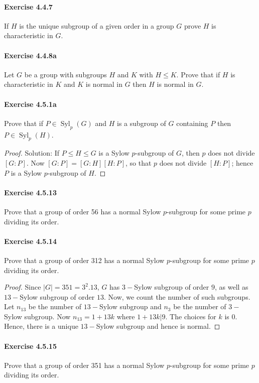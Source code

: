 \documentclass{article}
\theoremstyle{definition}
\begin{document}
\paragraph{Exercise 4.4.7} If $H$ is the unique subgroup of a given order in a group $G$ prove $H$ is characteristic in $G$.

\paragraph{Exercise 4.4.8a} Let $G$ be a group with subgroups $H$ and $K$ with $H \leq K$. Prove that if $H$ is characteristic in $K$ and $K$ is normal in $G$ then $H$ is normal in $G$.

\paragraph{Exercise 4.5.1a} Prove that if $P \in \operatorname{Syl}_{p}(G)$ and $H$ is a subgroup of $G$ containing $P$ then $P \in \operatorname{Syl}_{p}(H)$.
\begin{proof}
    Solution: If $P \leq H \leq G$ is a Sylow $p$-subgroup of $G$, then $p$ does not divide $[G: P]$. Now $[G: P]=[G: H][H: P]$, so that $p$ does not divide $[H: P]$; hence $P$ is a Sylow $p$-subgroup of $H$.
\end{proof}


\paragraph{Exercise 4.5.13} Prove that a group of order 56 has a normal Sylow $p$-subgroup for some prime $p$ dividing its order.

\paragraph{Exercise 4.5.14} Prove that a group of order 312 has a normal Sylow $p$-subgroup for some prime $p$ dividing its order.
\begin{proof}
    Since $|G|=351=3^{2}.13$, $G$ has $3-$Sylow subgroup of order $9$, as well as $13-$Sylow subgroup of order $13$. Now, we count the number of such subgroups. Let $n_{13}$ be the number of $13-$Sylow subgroup and $n_{3}$ be the number of  $3-$Sylow subgroup. Now $n_{13}=1+13k$ where $1+13k|9$. The choices for $k$ is $0$. Hence, there is a unique $13-$Sylow subgroup and hence is normal.

\end{proof}


\paragraph{Exercise 4.5.15} Prove that a group of order 351 has a normal Sylow $p$-subgroup for some prime $p$ dividing its order.
\end{document}
